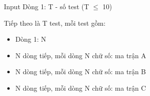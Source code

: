 Input
Dòng 1: T - số test (T  $\le$  10)

Tiếp theo là T test, mỗi test gồm:
\begin{itemize}
	\item Dòng 1: N
	\item N dòng tiếp, mỗi dòng N chữ số: ma trận A
	\item N dòng tiếp, mỗi dòng N chữ số: ma trận B
	\item N dòng tiếp, mỗi dòng N chữ số: ma trận C
\end{itemize}